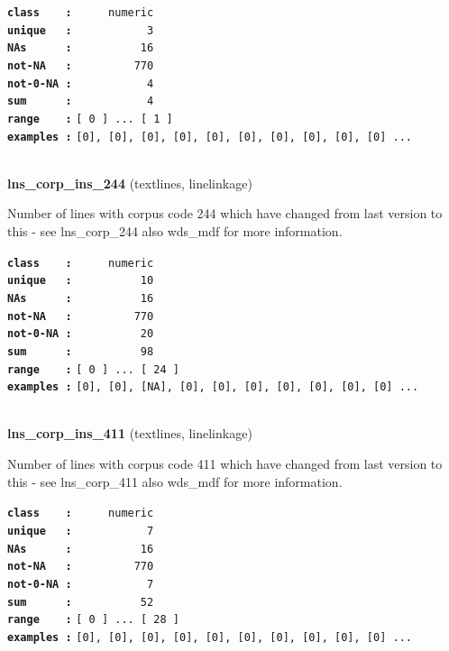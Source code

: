 \documentclass[]{article}
\begin{document}
\textbf{\texttt{class\ \ \ \ :}} \texttt{~~~~~numeric}\\
\textbf{\texttt{unique\ \ \ :}} \texttt{~~~~~~~~~~~3}\\
\textbf{\texttt{NAs\ \ \ \ \ \ :}} \texttt{~~~~~~~~~~16}\\
\textbf{\texttt{not-NA\ \ \ :}} \texttt{~~~~~~~~~770}\\
\textbf{\texttt{not-0-NA\ :}} \texttt{~~~~~~~~~~~4}\\
\textbf{\texttt{sum\ \ \ \ \ \ :}} \texttt{~~~~~~~~~~~4}\\
\textbf{\texttt{range\ \ \ \ :}}
\texttt{{[}\ 0\ {]}\ ...\ {[}\ 1\ {]}}\\
\textbf{\texttt{examples\ :}}
\texttt{{[}0{]},\ {[}0{]},\ {[}0{]},\ {[}0{]},\ {[}0{]},\ {[}0{]},\ {[}0{]},\ {[}0{]},\ {[}0{]},\ {[}0{]}\ ...}\\

~

\textbf{lns\_corp\_ins\_244} (textlines, linelinkage)

Number of lines with corpus code 244 which have changed from last
version to this - see lns\_corp\_244 also wds\_mdf for more information.

\textbf{\texttt{class\ \ \ \ :}} \texttt{~~~~~numeric}\\
\textbf{\texttt{unique\ \ \ :}} \texttt{~~~~~~~~~~10}\\
\textbf{\texttt{NAs\ \ \ \ \ \ :}} \texttt{~~~~~~~~~~16}\\
\textbf{\texttt{not-NA\ \ \ :}} \texttt{~~~~~~~~~770}\\
\textbf{\texttt{not-0-NA\ :}} \texttt{~~~~~~~~~~20}\\
\textbf{\texttt{sum\ \ \ \ \ \ :}} \texttt{~~~~~~~~~~98}\\
\textbf{\texttt{range\ \ \ \ :}}
\texttt{{[}\ 0\ {]}\ ...\ {[}\ 24\ {]}}\\
\textbf{\texttt{examples\ :}}
\texttt{{[}0{]},\ {[}0{]},\ {[}NA{]},\ {[}0{]},\ {[}0{]},\ {[}0{]},\ {[}0{]},\ {[}0{]},\ {[}0{]},\ {[}0{]}\ ...}\\

~

\textbf{lns\_corp\_ins\_411} (textlines, linelinkage)

Number of lines with corpus code 411 which have changed from last
version to this - see lns\_corp\_411 also wds\_mdf for more information.

\textbf{\texttt{class\ \ \ \ :}} \texttt{~~~~~numeric}\\
\textbf{\texttt{unique\ \ \ :}} \texttt{~~~~~~~~~~~7}\\
\textbf{\texttt{NAs\ \ \ \ \ \ :}} \texttt{~~~~~~~~~~16}\\
\textbf{\texttt{not-NA\ \ \ :}} \texttt{~~~~~~~~~770}\\
\textbf{\texttt{not-0-NA\ :}} \texttt{~~~~~~~~~~~7}\\
\textbf{\texttt{sum\ \ \ \ \ \ :}} \texttt{~~~~~~~~~~52}\\
\textbf{\texttt{range\ \ \ \ :}}
\texttt{{[}\ 0\ {]}\ ...\ {[}\ 28\ {]}}\\
\textbf{\texttt{examples\ :}}
\texttt{{[}0{]},\ {[}0{]},\ {[}0{]},\ {[}0{]},\ {[}0{]},\ {[}0{]},\ {[}0{]},\ {[}0{]},\ {[}0{]},\ {[}0{]}\ ...}\\
\end{document}
